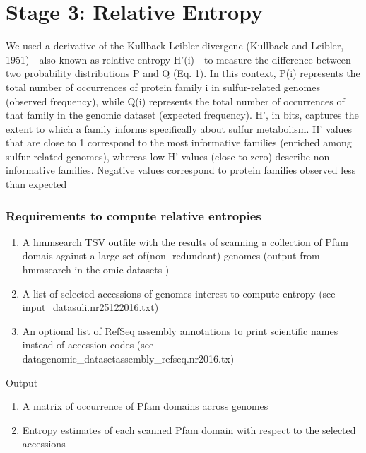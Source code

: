 \documentclass[12pt]{report}
\begin{document}
\section{Stage 3: Relative Entropy}
\label{stage3}

We used a derivative of the Kullback-Leibler divergenc 
(Kullback and Leibler, 1951)—also known as relative entropy 
H’(i)—to measure the difference between two probability 
distributions P and Q (Eq. 1). In this context, P(i) 
represents the total number of occurrences of protein 
family i in sulfur-related genomes (observed frequency), 
while Q(i) represents the total number of occurrences of 
that family in the genomic dataset (expected frequency). 
H’, in bits, captures the extent to which a family informs 
specifically about sulfur metabolism. H’ values that are 
close to 1 correspond to the most informative families 
(enriched among sulfur-related genomes), whereas low H’ 
values (close to zero) describe non-informative families. 
Negative values correspond to protein families observed 
less than expected


\subsubsection{Requirements to compute relative entropies}
\label{entropies_requirements}
\begin{enumerate}
\item  A hmmsearch TSV outfile with the results of scanning 
a collection of Pfam domais against  a large set of(non-
redundant) genomes (output from hmmsearch in the omic 
datasets )
\item A list of selected accessions of genomes interest to compute entropy (see
input\_data\/suli.nr25122016.txt)
\item An optional list of RefSeq assembly annotations to print scientific names
instead of accession codes (see
\/data\/genomic\_dataset\/assembly\_refseq.nr2016.tx)
\end{enumerate}

Output

\begin{enumerate}

\item A matrix of occurrence of Pfam domains across genomes
\item Entropy estimates of each scanned Pfam domain with respect to the selected accessions
\end{enumerate}
\end{document}
